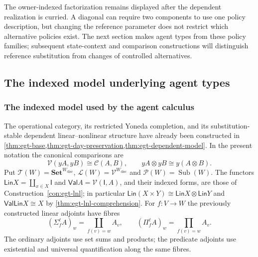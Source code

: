 \documentclass[11pt,a4paper]{article}
\numberwithin{equation}{section}
\theoremstyle{definition}
\theoremstyle{remark}
\theoremstyle{plain}
\providecommand{\Lin}{\mathsf{Lin}}
\providecommand{\Val}{\mathsf{Val}}
\providecommand{\I}{\mathsf{I}}
\providecommand{\cC}{\mathcal{C}}
\providecommand{\cV}{\mathcal{V}}
\providecommand{\cT}{\mathcal{T}}
\providecommand{\cL}{\mathcal{L}}
\providecommand{\cP}{\mathcal{P}}
\providecommand{\Set}{\mathbf{Set}}
\providecommand{\Sub}{\mathop{\mathrm{Sub}}}
\begin{document}
The owner-indexed factorization remains displayed after the dependent
realization is curried. A diagonal can require two components to use one
policy description, but changing the reference parameter does not restrict
which alternative policies exist. The next section makes agent types from
these policy families; subsequent state-context and comparison constructions
will distinguish reference substitution from changes of controlled
alternatives.

\subsection{The indexed model underlying agent types}
\label{agt-sec-model}

\subsubsection{The indexed model used by the agent calculus}

The operational category, its restricted Yoneda completion, and its
substitution-stable dependent linear--nonlinear structure have already been
constructed in \cref{thm:egt-base,thm:egt-day-preservation,thm:egt-dependent-model}.
In the present notation the canonical comparisons are
\begin{equation}
  \cV(yA,yB)\cong\cC(A,B),\qquad
  yA\otimes yB\cong y(A\otimes B).
  \label{agt-eq-yoneda}
\end{equation}
Put $\cT(W)=\Set^{W_{\mathrm{disc}}}$,
$\cL(W)=\cV^{W_{\mathrm{disc}}}$ and $\cP(W)=\Sub(W)$.
The functors $\Lin X=\coprod_{x\in X}\I$ and
$\Val A=\cV(\I,A)$, and their indexed forms, are those of
Construction~\ref{con:egt-lnl}; in particular
$\Lin(X\times Y)\cong\Lin X\otimes\Lin Y$ and
$\Val\Lin X\cong X$ by \cref{thm:egt-lnl-comprehension}.
For $f:V\to W$ the previously constructed linear adjoints have fibres
\begin{equation}
 (\Sigma_f^\ell A)_w=\coprod_{f(v)=w}A_v,
 \qquad(\Pi_f^\ell A)_w=\prod_{f(v)=w}A_v.
 \label{agt-eq-indexed-adjoints}
\end{equation}
The ordinary adjoints use set sums and products; the predicate adjoints
use existential and universal quantification along the same fibres.
\end{document}
